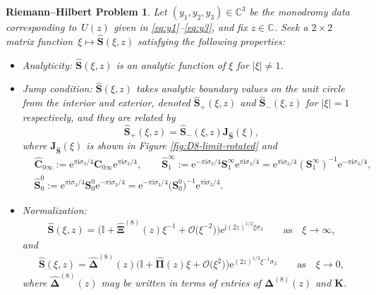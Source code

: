 \documentclass[11pt]{article}
\numberwithin{equation}{section}
\numberwithin{equation}{section}
\newtheorem{rhp}[Theorem]{Riemann--Hilbert Problem}
\newcommand{\ee}{\mathrm{e}}
\newcommand{\ii}{\mathrm{i}}
\newcommand{\C}{{\mathbb{C}}}
\begin{document}
\begin{rhp}
Let $(y_1,y_2, y_3) \in \C^3$ be the monodromy data corresponding to~$U(z)$ given in \eqref{eq:y1}--\eqref{eq:y3}, and fix $z\in\mathbb{C}$. Seek a $2\times 2$ matrix function~${\xi\mapsto\widehat{\mathbf{S}}(\xi, z)}$ satisfying the following properties:
\begin{itemize}\itemsep=0pt
 \item Analyticity: $\widehat{\mathbf{S}}(\xi, z)$ is an analytic function of $\xi$ for $|\xi|\neq 1$.
 \item Jump condition:
 $\widehat{\mathbf{S}}(\xi, z)$ takes analytic boundary values on the unit circle from the interior and exterior, denoted $\widehat{\mathbf{S}}_+(\xi,z)$ and $\widehat{\mathbf{S}}_-(\xi,z)$ for $|\xi|=1$ respectively, and they are related by
 \begin{equation*}
 \widehat{\mathbf{S}}_+(\xi,z)=\widehat{\mathbf{S}}_-(\xi,z) \mathbf J_{\widehat{\mathbf{S}}}(\xi),
 \end{equation*}
 where $\mathbf J_{\widehat{\mathbf{S}}}(\xi)$ is shown in Figure {\rm\ref{fig:D8-limit-rotated}} and
 \begin{align}
 &\widehat{\mathbf C}_{0\infty} := \ee^{\pi \ii \sigma_3/4} \mathbf C_{0\infty}\ee^{\pi \ii \sigma_3/4}, \qquad
 \widehat{\mathbf S}_1^\infty := \ee^{-\pi \ii \sigma_3/4} {\mathbf S}_1^\infty \ee^{\pi \ii \sigma_3/4} = \ee^{\pi \ii \sigma_3/4} ({\mathbf S}_1^\infty)^{-1} \ee^{-\pi \ii \sigma_3/4}, \nonumber\\
 & \widehat{\mathbf{S}}_0^0:= \ee^{\pi \ii \sigma_3/4} {\mathbf S}_0^0 \ee^{-\pi \ii \sigma_3/4} = \ee^{-\pi \ii \sigma_3/4} \big({\mathbf S}_0^0\big)^{-1} \ee^{\pi \ii \sigma_3/4}. \label{eq:hat-jumps}
 \end{align}
 \item Normalization:
\begin{gather}\label{eq:s-hat-norm-inf}\widehat{\mathbf{S}}(\xi,z) = \big(\mathbb{I} +\widehat{\mathbf{\Xi}}^{(8)}(z)\xi^{-1}+ \mathcal{O}\big(\xi^{-2}\big) \big) \ee^{\ii (2z)^{1/2} \xi \sigma_3 } \qquad \text{as} \quad \xi \to \infty,
\end{gather}
 and
\begin{gather}
\widehat{\mathbf{S}}(\xi,z) = \widehat{\mathbf{\Delta}}^{(8)}(z) \big(\mathbb{I} + \widehat{\mathbf{\Pi}}(z)\xi+\mathcal{O}\big(\xi^2\big) \big) \ee^{ (2z)^{1/2} \xi^{-1} \sigma_3 } \qquad \text{as} \quad \xi \to 0,\label{eq:s-hat-norm-zero}
\end{gather}
 where $\widehat{\mathbf{\Delta}}^{(8)}(z)$ may be written in terms of entries of $\mathbf{\Delta}^{(8)}(z)$ and $\mathbf{K}$.
\end{itemize}
\label{rhp:S-hat}
\end{rhp}
\end{document}
